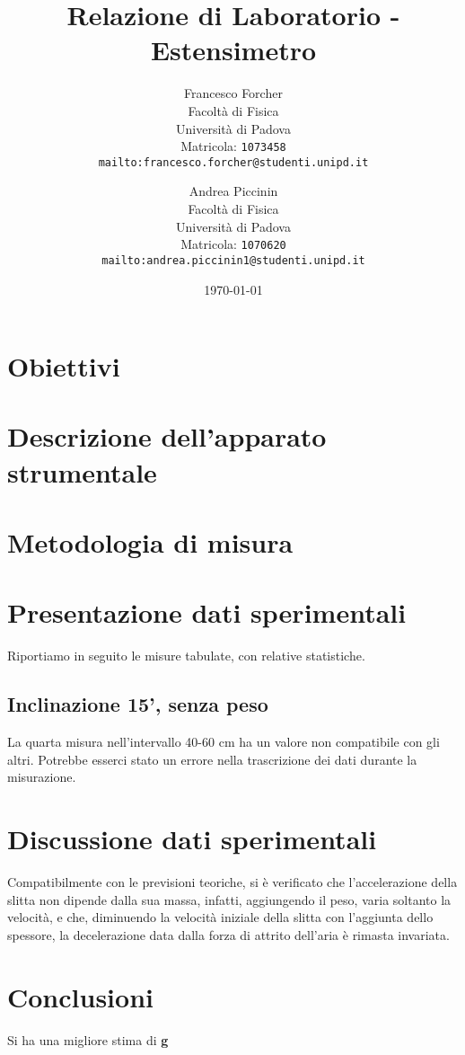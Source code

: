 \documentclass[12pt]{article} %
\title {Relazione di Laboratorio - Estensimetro}
\author{Francesco Forcher\\
Facoltà di Fisica\\
Università di Padova\\
Matricola: \texttt{1073458}\\
\texttt{mailto:francesco.forcher@studenti.unipd.it}\\
\and
Andrea Piccinin\\ 
Facoltà di Fisica\\
Università di Padova\\
Matricola: \texttt{1070620}\\
\texttt{mailto:andrea.piccinin1@studenti.unipd.it}\\
}
\date{\today}
\begin{document}
\maketitle %
\tableofcontents %



        

\section{Obiettivi}
		
\section{Descrizione dell'apparato strumentale}
		
\section{Metodologia di misura}
		
\section{Presentazione dati sperimentali}			
	Riportiamo in seguito le misure tabulate, con relative statistiche.
	
	\subsection {Inclinazione 15', senza peso}
	La quarta misura nell'intervallo 40-60 cm ha un valore non compatibile con gli altri. Potrebbe esserci stato un errore nella trascrizione dei dati durante la misurazione.

\section{Discussione dati sperimentali}
	Compatibilmente con le previsioni teoriche, si è verificato che l'accelerazione della slitta non dipende dalla sua massa, infatti, 		aggiungendo il peso, varia soltanto la velocità, e che, diminuendo la velocità iniziale della slitta con l'aggiunta dello spessore, 		la decelerazione data dalla forza di attrito dell'aria è rimasta invariata. 

\section{Conclusioni}
	Si ha una migliore stima di \textbf{g} 
	
\end{document}
